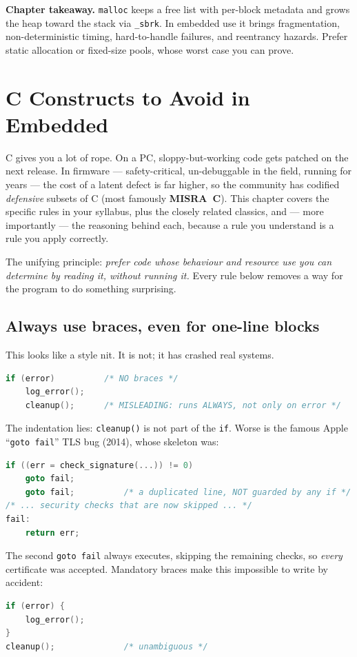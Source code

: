 \documentclass[11pt,a4paper,oneside]{book}
\newcommand{\code}[1]{\texttt{#1}}
\begin{document}
\begin{keyidea}
\textbf{Chapter takeaway.} \code{malloc} keeps a free list with per-block
metadata and grows the heap toward the stack via \code{\_sbrk}. In embedded use
it brings fragmentation, non-deterministic timing, hard-to-handle failures, and
reentrancy hazards. Prefer static allocation or fixed-size pools, whose worst
case you can prove.
\end{keyidea}

\chapter{C Constructs to Avoid in Embedded}
\label{ch:avoid}

C gives you a lot of rope. On a PC, sloppy-but-working code gets patched on the
next release. In firmware --- safety-critical, un-debuggable in the field,
running for years --- the cost of a latent defect is far higher, so the
community has codified \emph{defensive} subsets of C (most famously
\textbf{MISRA~C}). This chapter covers the specific rules in your syllabus, plus
the closely related classics, and --- more importantly --- the reasoning behind
each, because a rule you understand is a rule you apply correctly.

\begin{keyidea}
The unifying principle: \emph{prefer code whose behaviour and resource use you
can determine by reading it, without running it.} Every rule below removes a way
for the program to do something surprising.
\end{keyidea}

\section{Always use braces, even for one-line blocks}
This looks like a style nit. It is not; it has crashed real systems.
\begin{lstlisting}[language=C]
if (error)          /* NO braces */
    log_error();
    cleanup();      /* MISLEADING: runs ALWAYS, not only on error */
\end{lstlisting}
The indentation lies: \code{cleanup()} is not part of the \code{if}. Worse is
the famous Apple ``\code{goto fail}'' TLS bug (2014), whose skeleton was:
\begin{lstlisting}[language=C]
if ((err = check_signature(...)) != 0)
    goto fail;
    goto fail;          /* a duplicated line, NOT guarded by any if */
/* ... security checks that are now skipped ... */
fail:
    return err;
\end{lstlisting}
The second \code{goto fail} always executes, skipping the remaining checks, so
\emph{every} certificate was accepted. Mandatory braces make this impossible to
write by accident:
\begin{lstlisting}[language=C]
if (error) {
    log_error();
}
cleanup();              /* unambiguous */
\end{lstlisting}
\end{document}
